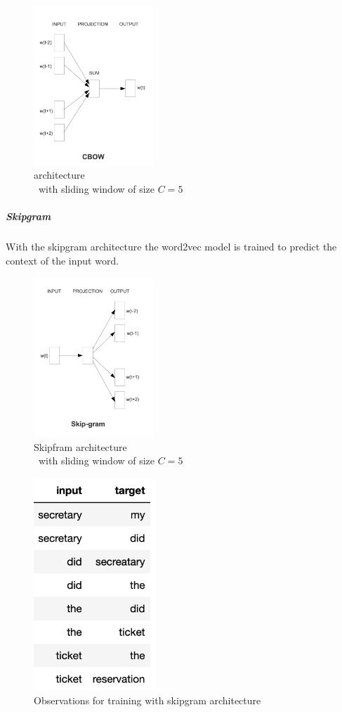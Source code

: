 		\begin{figure}[ht]
			\centering
			\includegraphics[height=6cm]{Bilder/word2vec/architecture_cbow.png}
			\caption{ architecture\\\ with sliding window of size $C=5$ }
			\label{fig:cbow-architecture}
		\end{figure}
	
		\subparagraph{Skipgram} 
		With the skipgram architecture the word2vec model is trained to predict the context of the input word.
		
		\begin{figure}[ht]
			\centering
			\includegraphics[height=6cm]{Bilder/word2vec/architecture_skipgram.png}
			\caption{Skipfram architecture\\\ with sliding window of size $C=5$ }
			\label{fig:cbow-architecture}
		\end{figure}
	
		\begin{figure}[ht]
			\centering
			\includegraphics[height=8cm]{Bilder/word2vec/skipgram.png}
			\caption{Observations for training with skipgram architecture}
			\label{fig:cbow-architecture}
		\end{figure}
		
